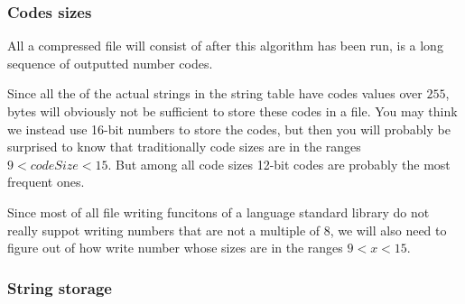 \begin{refsection}
\begin{algorithm}[H]
\begin{algorithmic}[1]
    \While{\neof}

       \label{algl:hasingcheckintable}
         \label{algl:hasgetcode}
      \Else
        \State {}


          \State {}\label{algl:hashadd}

        \EndIf


      \EndIf


    \EndWhile

    \State {}
    \State {}

  \end{algorithmic}
\end{algorithm}

\subsubsection{Codes sizes}

All a \lzw compressed file will consist of after this algorithm has
been run, is a long sequence of outputted number codes.

Since all the of the actual strings in the string table have codes
values over $255$, bytes will obviously not be sufficient to store
these codes in a file. You may think we instead use 16-bit numbers to
store the codes, but then you will probably be surprised to know that
traditionally code sizes are in the ranges $9 <
codeSize < 15$. But among all code sizes 12-bit codes are probably the
most frequent ones.

Since most of all file writing funcitons of a language standard
library do not really suppot writing numbers that are not a multiple
of 8, we will also need to figure out of how write number whose sizes
are in the ranges $9 < x < 15$.

\subsubsection{String storage}

\newcommand{\strpair}[2]{(#1,#2)}


\end{refsection}
